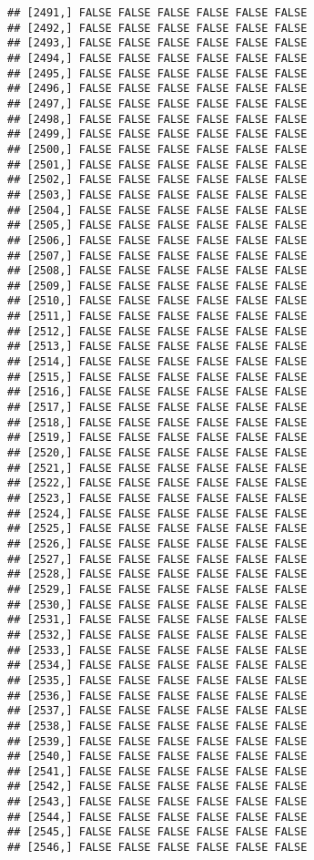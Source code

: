 \documentclass[
]{article}
\begin{document}
\begin{verbatim}
## [2491,] FALSE FALSE FALSE FALSE FALSE FALSE
## [2492,] FALSE FALSE FALSE FALSE FALSE FALSE
## [2493,] FALSE FALSE FALSE FALSE FALSE FALSE
## [2494,] FALSE FALSE FALSE FALSE FALSE FALSE
## [2495,] FALSE FALSE FALSE FALSE FALSE FALSE
## [2496,] FALSE FALSE FALSE FALSE FALSE FALSE
## [2497,] FALSE FALSE FALSE FALSE FALSE FALSE
## [2498,] FALSE FALSE FALSE FALSE FALSE FALSE
## [2499,] FALSE FALSE FALSE FALSE FALSE FALSE
## [2500,] FALSE FALSE FALSE FALSE FALSE FALSE
## [2501,] FALSE FALSE FALSE FALSE FALSE FALSE
## [2502,] FALSE FALSE FALSE FALSE FALSE FALSE
## [2503,] FALSE FALSE FALSE FALSE FALSE FALSE
## [2504,] FALSE FALSE FALSE FALSE FALSE FALSE
## [2505,] FALSE FALSE FALSE FALSE FALSE FALSE
## [2506,] FALSE FALSE FALSE FALSE FALSE FALSE
## [2507,] FALSE FALSE FALSE FALSE FALSE FALSE
## [2508,] FALSE FALSE FALSE FALSE FALSE FALSE
## [2509,] FALSE FALSE FALSE FALSE FALSE FALSE
## [2510,] FALSE FALSE FALSE FALSE FALSE FALSE
## [2511,] FALSE FALSE FALSE FALSE FALSE FALSE
## [2512,] FALSE FALSE FALSE FALSE FALSE FALSE
## [2513,] FALSE FALSE FALSE FALSE FALSE FALSE
## [2514,] FALSE FALSE FALSE FALSE FALSE FALSE
## [2515,] FALSE FALSE FALSE FALSE FALSE FALSE
## [2516,] FALSE FALSE FALSE FALSE FALSE FALSE
## [2517,] FALSE FALSE FALSE FALSE FALSE FALSE
## [2518,] FALSE FALSE FALSE FALSE FALSE FALSE
## [2519,] FALSE FALSE FALSE FALSE FALSE FALSE
## [2520,] FALSE FALSE FALSE FALSE FALSE FALSE
## [2521,] FALSE FALSE FALSE FALSE FALSE FALSE
## [2522,] FALSE FALSE FALSE FALSE FALSE FALSE
## [2523,] FALSE FALSE FALSE FALSE FALSE FALSE
## [2524,] FALSE FALSE FALSE FALSE FALSE FALSE
## [2525,] FALSE FALSE FALSE FALSE FALSE FALSE
## [2526,] FALSE FALSE FALSE FALSE FALSE FALSE
## [2527,] FALSE FALSE FALSE FALSE FALSE FALSE
## [2528,] FALSE FALSE FALSE FALSE FALSE FALSE
## [2529,] FALSE FALSE FALSE FALSE FALSE FALSE
## [2530,] FALSE FALSE FALSE FALSE FALSE FALSE
## [2531,] FALSE FALSE FALSE FALSE FALSE FALSE
## [2532,] FALSE FALSE FALSE FALSE FALSE FALSE
## [2533,] FALSE FALSE FALSE FALSE FALSE FALSE
## [2534,] FALSE FALSE FALSE FALSE FALSE FALSE
## [2535,] FALSE FALSE FALSE FALSE FALSE FALSE
## [2536,] FALSE FALSE FALSE FALSE FALSE FALSE
## [2537,] FALSE FALSE FALSE FALSE FALSE FALSE
## [2538,] FALSE FALSE FALSE FALSE FALSE FALSE
## [2539,] FALSE FALSE FALSE FALSE FALSE FALSE
## [2540,] FALSE FALSE FALSE FALSE FALSE FALSE
## [2541,] FALSE FALSE FALSE FALSE FALSE FALSE
## [2542,] FALSE FALSE FALSE FALSE FALSE FALSE
## [2543,] FALSE FALSE FALSE FALSE FALSE FALSE
## [2544,] FALSE FALSE FALSE FALSE FALSE FALSE
## [2545,] FALSE FALSE FALSE FALSE FALSE FALSE
## [2546,] FALSE FALSE FALSE FALSE FALSE FALSE

\end{verbatim}
\end{document}
